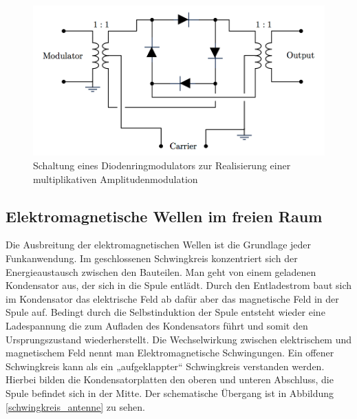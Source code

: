 		\begin{figure}[H]	
			\center	
			\includegraphics[scale = 0.35]{messwerte/circuit_diagram_parker.png}
			\caption{\centering Schaltung eines Diodenringmodulators zur Realisierung einer multiplikativen Amplitudenmodulation \cite{circuitpic}} %
			\label{circuit}	
		\end{figure}



\subsection{Elektromagnetische Wellen im freien Raum} %
\label{sub:antennen_und_elektromagnetische_wellen_im_freien_raum}

	Die Ausbreitung der elektromagnetischen Wellen ist die Grundlage jeder Funkanwendung.
	Im geschlossenen Schwingkreis konzentriert sich der Energieaustausch zwischen den Bauteilen.
	Man geht von einem geladenen Kondensator aus, der sich in die Spule entlädt. Durch den
	Entladestrom baut sich im Kondensator das elektrische Feld ab dafür aber das magnetische Feld in
	der Spule auf. Bedingt durch die Selbstinduktion der Spule entsteht wieder eine Ladespannung die
	zum Aufladen des Kondensators führt und somit den Ursprungszustand wiederherstellt.
	Die Wechselwirkung zwischen elektrischem und magnetischem Feld nennt man Elektromagnetische Schwingungen.
	Ein offener Schwingkreis kann als ein „aufgeklappter“ Schwingkreis verstanden werden. 
	Hierbei bilden die Kondensatorplatten den oberen und unteren Abschluss, die Spule befindet sich in der Mitte. 
	Der schematische Übergang ist in Abbildung \ref{schwingkreis_antenne} zu sehen. \cite{unterlagen}

